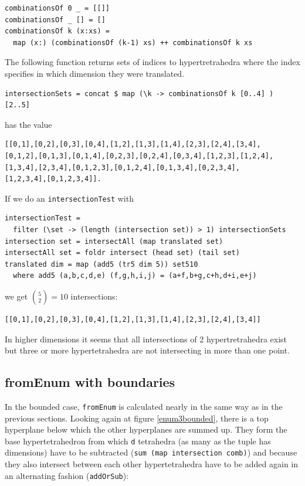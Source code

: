 \documentclass{tmr}
\begin{document}
\begin{Verbatim}
combinationsOf 0 _ = [[]]
combinationsOf _ [] = []
combinationsOf k (x:xs) =
  map (x:) (combinationsOf (k-1) xs) ++ combinationsOf k xs
\end{Verbatim}

The following function returns sets of indices to hypertretrahedra where the index specifies in which dimension they were translated.

\begin{Verbatim}
intersectionSets = concat $ map (\k -> combinationsOf k [0..4] ) [2..5]
\end{Verbatim}

has the value

\begin{Verbatim}
[[0,1],[0,2],[0,3],[0,4],[1,2],[1,3],[1,4],[2,3],[2,4],[3,4],
[0,1,2],[0,1,3],[0,1,4],[0,2,3],[0,2,4],[0,3,4],[1,2,3],[1,2,4],
[1,3,4],[2,3,4],[0,1,2,3],[0,1,2,4],[0,1,3,4],[0,2,3,4],
[1,2,3,4],[0,1,2,3,4]].
\end{Verbatim}

If we do an \verb|intersectionTest| with
\begin{Verbatim}
intersectionTest =
  filter (\set -> (length (intersection set)) > 1) intersectionSets
intersection set = intersectAll (map translated set)
intersectAll set = foldr intersect (head set) (tail set)
translated dim = map (add5 (tr5 dim 5)) set510
  where add5 (a,b,c,d,e) (f,g,h,i,j) = (a+f,b+g,c+h,d+i,e+j)
\end{Verbatim}
we get $\binom{5}{2} = 10$ intersections:

\begin{Verbatim}
[[0,1],[0,2],[0,3],[0,4],[1,2],[1,3],[1,4],[2,3],[2,4],[3,4]]
\end{Verbatim}

In higher dimensions it seems that all intersections of 2 hypertretrahedra exist but 
three or more hypertetrahedra are not intersecting in more than one point.

\subsection{fromEnum with boundaries}
In the bounded case, \verb|fromEnum| is calculated nearly in the same way as in the 
previous sections. Looking again at figure \ref{enum3bounded}, there is a top hyperplane 
below which the other hyperplanes are summed up. They form the base hypertetrahedron 
from which \verb|d| tetrahedra (as many as the tuple has dimensions) have to be subtracted 
(\verb|sum (map intersection comb)|) and because they also intersect between each other 
hypertetrahedra have to be added again in an alternating fashion (\verb|addOrSub|):
\end{document}
